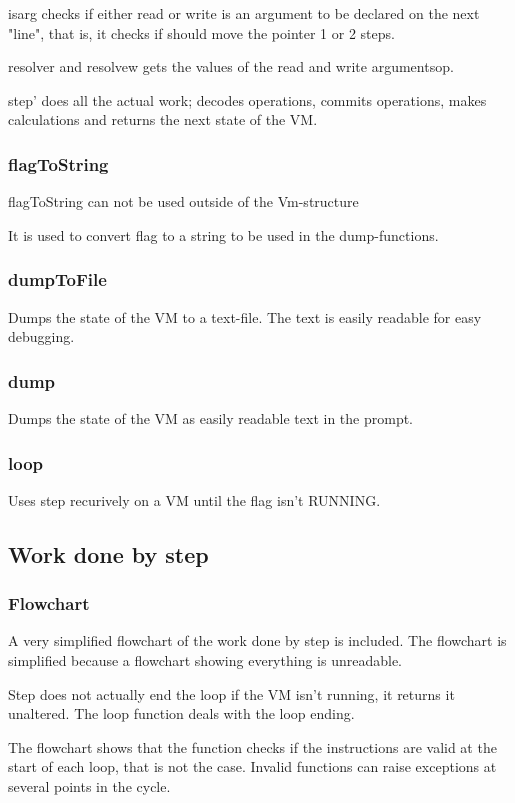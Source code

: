 isarg checks if either read or write is an argument to be declared on the next "line", that is, it checks if should move the pointer 1 or 2 steps.

resolver and resolvew gets the values of the read and write argumentsop.

step' does all the actual work; decodes operations, commits operations, makes calculations and returns the next state of the VM.

\subsubsection{flagToString}
flagToString can not be used outside of the Vm-structure

It is used to convert flag to a string to be used in the dump-functions.

\subsubsection{dumpToFile}
Dumps the state of the VM to a text-file. The text is easily readable for easy debugging.

\subsubsection{dump}
Dumps the state of the VM as easily readable text in the prompt.

\subsubsection{loop}
Uses step recurively on a VM until the flag isn't RUNNING.

\subsection{Work done by step}

\subsubsection{Flowchart}
A very simplified flowchart of the work done by step is included. The flowchart is simplified because a flowchart showing everything is unreadable.

Step does not actually end the loop if the VM isn't running, it returns it unaltered. The loop function deals with the loop ending.

The flowchart shows that the function checks if the instructions are valid at the start of each loop, that is not the case. Invalid functions can raise exceptions at several points in the cycle.

